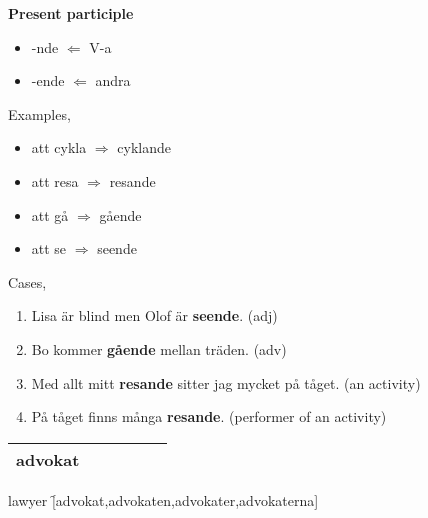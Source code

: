 
\begin{flushleft}
    \textbf{Present participle}
    \begin{itemize}
        \item -nde $\Leftarrow$ V-a
        \item -ende $\Leftarrow$ andra
    \end{itemize}

    Examples,
    \begin{itemize}
        \item att cykla $\Rightarrow$ cyklande
        \item att resa $\Rightarrow$ resande
        \item att gå $\Rightarrow$ gående
        \item att se $\Rightarrow$ seende
    \end{itemize}

    Cases,
    \begin{enumerate}
        \item Lisa är blind men Olof är \textbf{seende}. (adj)
        \item Bo kommer \textbf{gående} mellan träden. (adv)
        \item Med allt mitt \textbf{resande} sitter jag mycket på tåget. (an activity)
        \item På tåget finns många \textbf{resande}. (performer of an activity)
    \end{enumerate}
\end{flushleft}

\begin{center}
    \begin{tabular}{|c c c c c c|}
        \hline
        advokat &&&&& \\
        \hline
    \end{tabular}
\end{center}

\begin{questions}
    \begin{multicols}{2}
        \raggedcolumns
        \question lawyer \f[advokat,advokaten,advokater,advokaterna]
    \end{multicols}
\end{questions}
